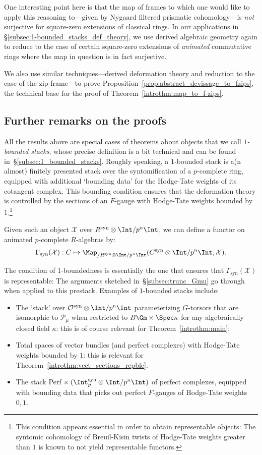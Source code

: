 \documentclass[10pt]{amsart}
\begin{document}
One interesting point here is that the map of frames to which one would like to apply this reasoning to---given by Nygaard filtered prismatic cohomology---is \emph{not} surjective for square-zero extensions of classical rings. In our applications in \S\ref{subsec:1-bounded_stacks_def_theory}, we use derived algebraic geometry again to reduce to the case of certain square-zero extensions of \emph{animated} commutative rings where the map in question is in fact surjective.

We also use similar techniques---derived deformation theory and reduction to the case of the zip frame---to prove Proposition~\ref{prop:abstract_devissage_to_fzips}, the technical base for the proof of Theorem~\ref{introthm:map_to_f-zips}.

\subsection{Further remarks on the proofs}
All the results above are special cases of theorems about objects that we call \emph{$1$-bounded stacks}, whose precise definition is a bit technical and can be found in~\S\ref{subsec:1_bounded_stacks}. Roughly speaking, a $1$-bounded stack is a(n almost) finitely presented stack over the syntomification of a $p$-complete ring, equipped with additional `bounding data' for the Hodge-Tate weights of its cotangent complex. This bounding condition ensures that the deformation theory is controlled by the sections of an $F$-gauge with Hodge-Tate weights bounded by $1$.\footnote{This condition appears essential in order to obtain representable objects: The syntomic cohomology of Breuil-Kisin twists of Hodge-Tate weights greater than $1$ is known to not yield representable functors.} 

Given such an object $\mathcal{X}$ over $R^{\mathrm{syn}}\otimes\Int/p^n\Int$, we can define a functor on animated $p$-complete $R$-algebras by:
\[
\Gamma_{\mathrm{syn}}(\mathcal{X}):C\mapsto \Map_{/R^{\mathrm{syn}}\otimes\Int/p^n\Int}(C^{\mathrm{syn}}\otimes\Int/p^n\Int,\mathcal{X}).
\]

The condition of $1$-boundedness is essentially the one that ensures that $\Gamma_{\mathrm{syn}}(\mathcal{X})$ is representable: The arguments sketched in~\S\ref{subsec:trunc_Gmu} go through when applied to this prestack. Examples of $1$-bounded stacks include:
\begin{itemize}
   \item The `stack' over $\mathcal{O}^{\mathrm{syn}}\otimes\Int/p^n\Int$ parameterizing $G$-torsors that are isomorphic to $\mathcal{P}_\mu$ when restricted to $B\Gm\times\Spec \kappa$ for any algebraically closed field $\kappa$: this is of course relevant for Theorem~\ref{introthm:main};
   \item Total spaces of vector bundles (and perfect complexes) with Hodge-Tate weights bounded by $1$: this is relevant for Theorem~\ref{introthm:vect_sections_repble}.
   \item The stack $\mathrm{Perf}\times (\Int_p^{\mathrm{syn}}\otimes\Int/p^n\Int)$ of perfect complexes, equipped with bounding data that picks out perfect $F$-gauges of Hodge-Tate weights $0,1$.
\end{itemize}
\end{document}
